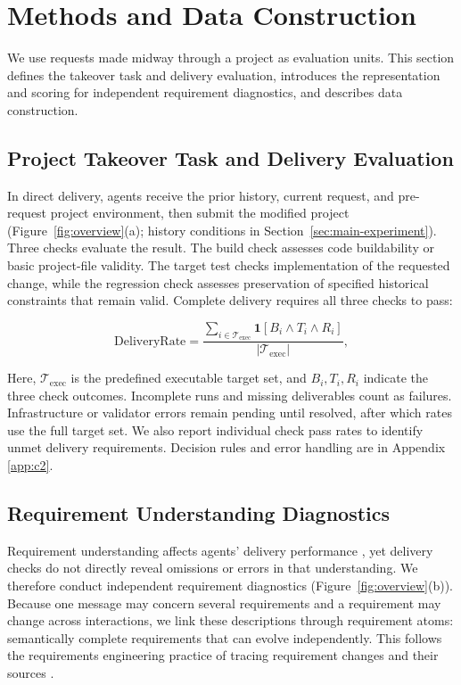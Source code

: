 \documentclass{article} %
\begin{document}
\section{Methods and Data Construction}
\label{sec:methods}
\label{sec:formulation}

We use requests made midway through a project as evaluation units. This section defines the takeover task and delivery evaluation, introduces the representation and scoring for independent requirement diagnostics, and describes data construction.

\subsection{Project Takeover Task and Delivery Evaluation}
\label{sec:delivery-task}

In direct delivery, agents receive the prior history, current request, and pre-request project environment, then submit the modified project (Figure~\ref{fig:overview}(a); history conditions in Section~\ref{sec:main-experiment}). Three checks evaluate the result. The build check assesses code buildability or basic project-file validity. The target test checks implementation of the requested change, while the regression check assesses preservation of specified historical constraints that remain valid. Complete delivery requires all three checks to pass:

\begin{equation}
\mathrm{DeliveryRate}
=\frac{\sum_{i\in\mathcal T_{\mathrm{exec}}}
\mathbf 1[B_i\land T_i\land R_i]}
{|\mathcal T_{\mathrm{exec}}|},
\label{eq:delivery-rate}
\end{equation}

Here, $\mathcal T_{\mathrm{exec}}$ is the predefined executable target set, and $B_i,T_i,R_i$ indicate the three check outcomes. Incomplete runs and missing deliverables count as failures. Infrastructure or validator errors remain pending until resolved, after which rates use the full target set. We also report individual check pass rates to identify unmet delivery requirements. Decision rules and error handling are in Appendix \ref{app:c2}.

\subsection{Requirement Understanding Diagnostics}
\label{sec:requirement-diagnostics}

Requirement understanding affects agents' delivery performance \citep{mu2024clarifygpt,zhou2026swerpg}, yet delivery checks do not directly reveal omissions or errors in that understanding. We therefore conduct independent requirement diagnostics (Figure~\ref{fig:overview}(b)). Because one message may concern several requirements and a requirement may change across interactions, we link these descriptions through requirement atoms: semantically complete requirements that can evolve independently. This follows the requirements engineering practice of tracing requirement changes and their sources \citep{nuseibeh2000requirements,gotel1994analysis}.
\end{document}
